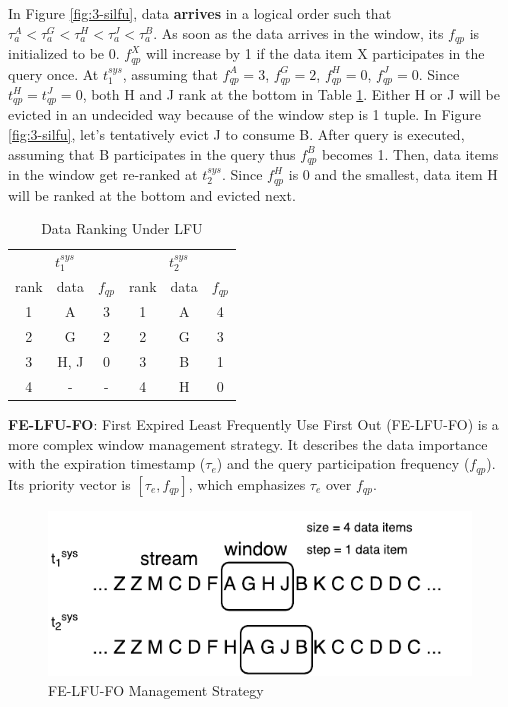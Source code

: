 In Figure \ref{fig:3-silfu}, data \textbf{arrives} in a logical order such that $\tau^{A}_{a} < \tau^{G}_{a} < \tau^{H}_{a} < \tau^{J}_{a} < \tau^{B}_{a}$. 
As soon as the data arrives in the window, its $f_{qp}$ is initialized to be 0.
$f^{X}_{qp}$ will increase by 1 if the data item X participates in the query once.
At $t^{sys}_{1}$, assuming that $f^{A}_{qp} = 3$, $f^{G}_{qp} = 2$, $f^{H}_{qp} = 0$, $f^{J}_{qp} = 0$. 
Since $t^{H}_{qp} = t^{J}_{qp} = 0$, both H and J rank at the bottom in Table \ref{tab:lfu}. 
Either H or J will be evicted in an undecided way because of the window step is 1 tuple. 
In Figure \ref{fig:3-silfu}, let's tentatively evict J to consume B. 
After query is executed, assuming that B participates in the query thus $f^{B}_{qp}$ becomes 1.
Then, data items in the window get re-ranked at $t^{sys}_{2}$.
Since $f^{H}_{qp}$ is 0 and the smallest, data item H will be ranked at the bottom and evicted next. 

\begin{table}[!htbp]
\centering
\caption{Data Ranking Under LFU}
\label{tab:lfu}
\begin{tabular}{|c|c|c||c|c|c|}
\hline
\multicolumn{3}{|c||}{$t^{sys}_{1}$} & \multicolumn{3}{c|}{$t^{sys}_{2}$} \\ \hhline{|======|}
rank & data & $f_{qp}$ & rank & data & $f_{qp}$ \\ \hhline{|=|=|=#=|=|=|}
1 & A & 3 & 1 & A & 4 \\ \hline
2 & G & 2 & 2 & G & 3 \\ \hline
3 & H, J & 0 & 3 & B & 1 \\ \hline
4 & - & - & 4 & H & 0 \\ \hline
\end{tabular}
\end{table}

\textbf{FE-LFU-FO}:
First Expired Least Frequently Use First Out (FE-LFU-FO) is a more complex window management strategy. 
It describes the data importance with the expiration timestamp ($\tau_{e}$) and the query participation frequency ($f_{qp}$).
Its priority vector is $[\tau_{e}, f_{qp}]$, which emphasizes $\tau_{e}$ over $f_{qp}$. 

\begin{figure}[!htbp]
	\centering
    \includegraphics[width=5in]{img/3-sifelfufo.pdf}
    \caption{FE-LFU-FO Management Strategy}
    \label{fig:3-sifelfufo}
\end{figure}

